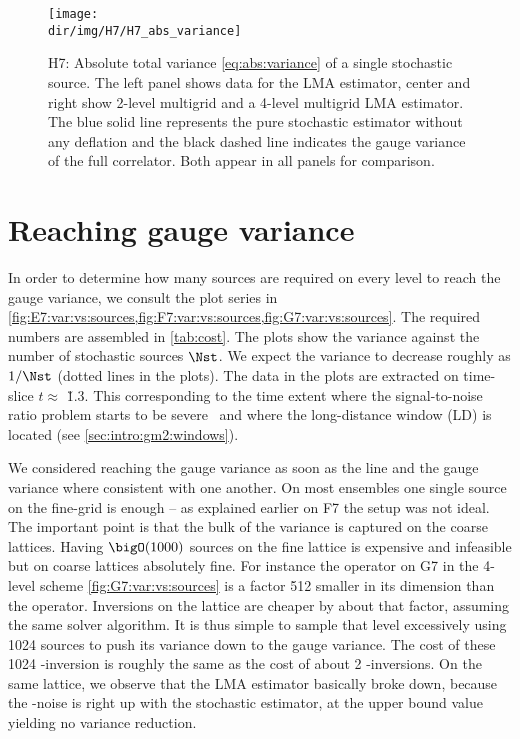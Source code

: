 \begin{figure}
\centering
\texttt{[image: \\dir/img/H7/H7\_abs\_variance]}
\caption{
H7: Absolute total variance \cref{eq:abs:variance} of a single stochastic source.
The left panel shows data for the LMA estimator, center and right show 2-level multigrid and a 4-level multigrid LMA estimator.
The blue solid line represents the pure stochastic estimator without any deflation and the black dashed line indicates the gauge variance of the full correlator. Both appear in all panels for comparison.
}
\label{fig:H7:abs:variance}
\end{figure}

\section{Reaching gauge variance}

In order to determine how many sources are required on every level to reach the gauge variance, we consult the plot series in \cref{fig:E7:var:vs:sources,fig:F7:var:vs:sources,fig:G7:var:vs:sources}.
The required numbers are assembled in \cref{tab:cost}.
The plots show the variance against the number of stochastic sources $\Nst$.
We expect the variance to decrease roughly as $1/\Nst$ (dotted lines in the plots).
The data in the plots are extracted on time-slice $t \approx $ \u{1.3}{\femto \metre}.
This corresponding to the time extent where the signal-to-noise ratio problem starts to be severe~\cite{Kuberski_2023} and where the long-distance window (LD) is located (see \cref{sec:intro:gm2:windows}).

We considered reaching the gauge variance as soon as the line and the gauge variance where consistent with one another.
On most ensembles one single source on the fine-grid is enough -- as explained earlier on F7 the setup was not ideal.
The important point is that the bulk of the variance is captured on the coarse lattices.
Having $\bigO(1000)$ sources on the fine lattice is expensive and infeasible but on coarse lattices absolutely fine.
For instance the  operator on G7 in the 4-level scheme \cref{fig:G7:var:vs:sources} is a factor \num{512} smaller in its dimension than the  operator.
Inversions on the  lattice are cheaper by about that factor, assuming the same solver algorithm.
It is thus simple to sample that level excessively using \num{1024} sources to push its variance down to the gauge variance.
The cost of these \num{1024} -inversion is roughly the same as the cost of about \num{2} -inversions.
On the same lattice, we observe that the LMA estimator basically broke down, because the -noise is right up with the stochastic estimator, \ie at the upper bound value yielding no variance reduction.

